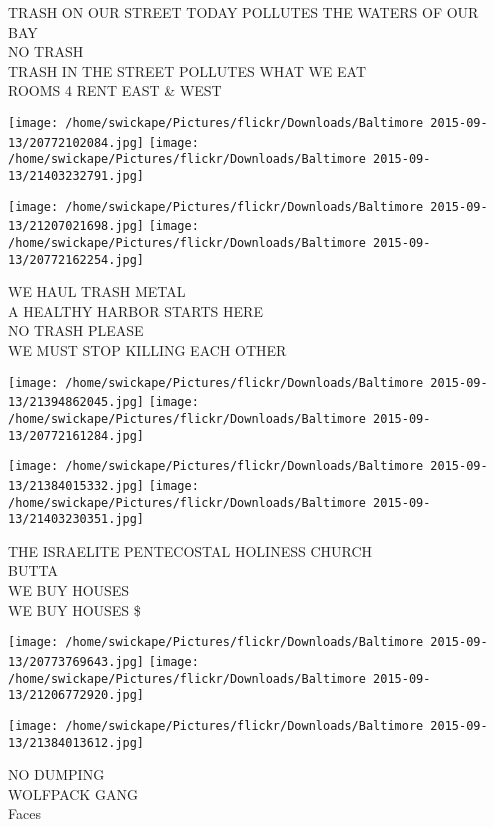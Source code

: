 \documentclass[10pt,letterpaper]{article}
\begin{document}
TRASH ON OUR STREET TODAY POLLUTES THE WATERS OF OUR BAY\\
NO TRASH\\
TRASH IN THE STREET POLLUTES WHAT WE EAT\\
ROOMS 4 RENT EAST \& WEST\\
\pagebreak

\texttt{[image: /home/swickape/Pictures/flickr/Downloads/Baltimore 2015-09-13/20772102084.jpg]}
\texttt{[image: /home/swickape/Pictures/flickr/Downloads/Baltimore 2015-09-13/21403232791.jpg]}

\texttt{[image: /home/swickape/Pictures/flickr/Downloads/Baltimore 2015-09-13/21207021698.jpg]}
\texttt{[image: /home/swickape/Pictures/flickr/Downloads/Baltimore 2015-09-13/20772162254.jpg]}

WE HAUL TRASH METAL\\
A HEALTHY HARBOR STARTS HERE\\
NO TRASH PLEASE\\
WE MUST STOP KILLING EACH OTHER\\
\pagebreak

\texttt{[image: /home/swickape/Pictures/flickr/Downloads/Baltimore 2015-09-13/21394862045.jpg]}
\texttt{[image: /home/swickape/Pictures/flickr/Downloads/Baltimore 2015-09-13/20772161284.jpg]}

\texttt{[image: /home/swickape/Pictures/flickr/Downloads/Baltimore 2015-09-13/21384015332.jpg]}
\texttt{[image: /home/swickape/Pictures/flickr/Downloads/Baltimore 2015-09-13/21403230351.jpg]}

THE ISRAELITE PENTECOSTAL HOLINESS CHURCH\\
BUTTA\\
WE BUY HOUSES\\
WE BUY HOUSES \$\\
\pagebreak

\texttt{[image: /home/swickape/Pictures/flickr/Downloads/Baltimore 2015-09-13/20773769643.jpg]}
\texttt{[image: /home/swickape/Pictures/flickr/Downloads/Baltimore 2015-09-13/21206772920.jpg]}

\vspace{0.25in}
\texttt{[image: /home/swickape/Pictures/flickr/Downloads/Baltimore 2015-09-13/21384013612.jpg]}

NO DUMPING\\
WOLFPACK GANG\\
Faces\\
\pagebreak
\end{document}
